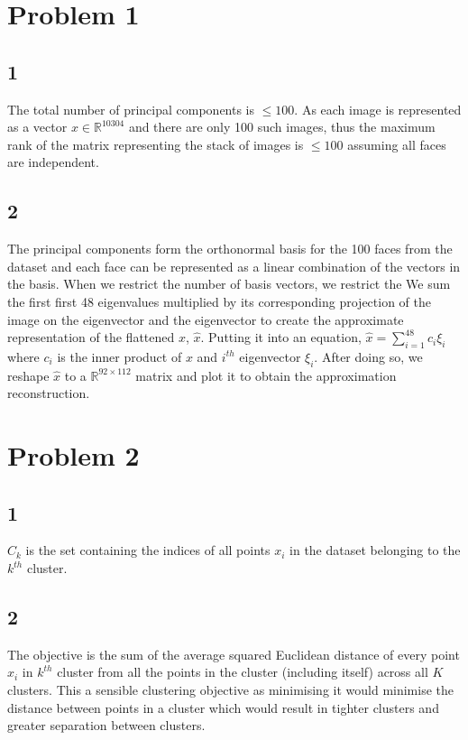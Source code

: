 \documentclass[twoside]{Homework}
\begin{document}
\maketitle

\section*{Problem 1}
\subsection*{1}
The total number of principal components is $\le 100$. As each image is represented as a vector $x \in \mathbb{R}^{10304}$ and there are only 100 such images, thus the maximum rank of the matrix representing the stack of images is $\le 100$ assuming all faces are independent.
\subsection*{2}
The principal components form the orthonormal basis for the 100 faces from the dataset and each face can be represented as a linear combination of the vectors in the basis. When we restrict the number of basis vectors, we restrict the  
We sum the first first 48 eigenvalues multiplied by its corresponding projection of the image on the eigenvector and the eigenvector to create the approximate representation of the flattened $x$, $\hat{x}$. Putting it into an equation, $\hat{x} = \sum^{48}_{i = 1} c_i \xi_i$ where $c_i$ is the inner product of $x$ and $i^{th}$ eigenvector $\xi_i$. After doing so, we reshape $\hat{x}$ to a $\mathbb{R}^{92 \times 112}$ matrix and plot it to obtain the approximation reconstruction.

\section*{Problem 2}
\subsection*{1}
$C_k$ is the set containing the indices of all points $x_i$ in the dataset belonging to the $k^{th}$ cluster.

\subsection*{2}
The objective is the sum of the average squared Euclidean distance of every point $x_i$ in $k^{th}$ cluster from all the points in the cluster (including itself) across all $K$ clusters. This a sensible clustering objective as minimising it would minimise the distance between points in a cluster which would result in tighter clusters and greater separation between clusters.
\end{document}
